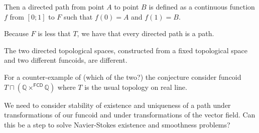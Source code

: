 Then a directed path from point $A$ to point $B$ is defined as a continuous function $f$ from $[0;1]$ to $F$ such that $f(0)=A$ and $f(1)=B$.

Because $F$ is less that $T$, we have that every directed path is a path.

\begin{conjecture}
The two directed topological spaces, constructed from a fixed topological space and two different funcoids,
are different.
\end{conjecture}

For a counter-example of (which of the two?) the conjecture consider funcoid $T\sqcap(\mathbb{Q}\times^{\mathsf{FCD}}\mathbb{Q})$
where $T$ is the usual topology on real line.

We need to consider stability of existence and uniqueness of a path under transformations of our funcoid and
under transformations of the vector field. Can this be a step to solve Navier-Stokes existence and smoothness problems?